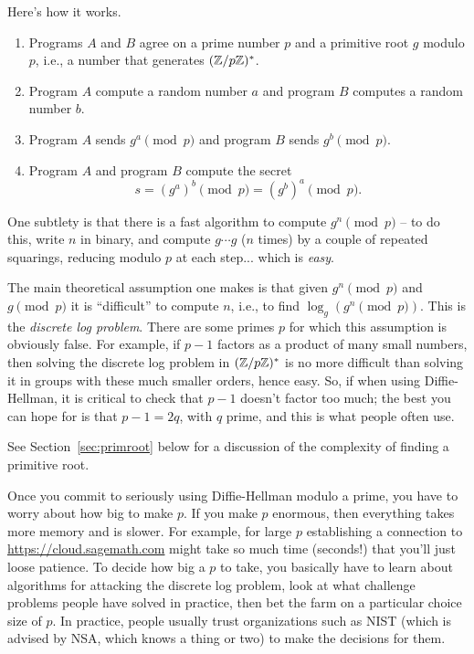 \documentclass{book}
\begin{document}
Here's how it works.
\begin{enumerate}
\item Programs $A$ and $B$ agree on a prime number $p$ and a primitive
root $g$ modulo $p$, i.e., a number that generates $(\mathbb{Z}/p\mathbb{Z})^*$.
\item Program $A$ compute a random number $a$ and program
$B$ computes a random number $b$.
\item Program $A$ sends $g^a\pmod{p}$ and program $B$
sends $g^b\pmod{p}$.
\item Program $A$ and program $B$ compute the secret
$$
   s = (g^a)^b\pmod{p} = (g^b)^a\pmod{p}.
$$
\end{enumerate}
One subtlety is that there is a fast algorithm to
compute $g^n\pmod{p}$ -- to do this, write $n$
in binary, and compute $g\cdots g$ ($n$ times)
by a couple of repeated squarings, reducing
modulo $p$ at each step... which is {\em easy}.

The main theoretical assumption one makes is that given $g^n\pmod{p}$
and $g\pmod{p}$ it is ``difficult'' to compute $n$, i.e., to find
$\log_g(g^n \pmod{p})$.  This is the {\em discrete log problem}.
There are some primes $p$ for which this assumption is obviously
false.  For example, if $p-1$ factors as a product of many small
numbers, then solving the discrete log problem in $(\mathbb{Z}/p\mathbb{Z})^*$ is
no more difficult than solving it in groups with these much smaller
orders, hence easy.   So, if when using Diffie-Hellman, it is critical
to check that $p-1$ doesn't factor too much; the best you can hope
for is that $p-1 = 2q$, with $q$ prime, and this is what people
often use.

 See Section~\ref{sec:primroot} below for a discussion of
 the complexity of finding a primitive root.

Once you commit to seriously using Diffie-Hellman modulo a prime, you have
to worry about how big to make $p$.  If you make $p$ enormous, then
everything takes more memory and is slower.  For example, for large $p$
establishing a connection to \url{https://cloud.sagemath.com} might
take so much time (seconds!) that you'll just loose patience.  To decide
how big a $p$ to take, you basically have to learn about algorithms for
attacking the discrete log problem, look at what challenge problems
people have solved in practice, then bet the farm on a particular
choice size of $p$.    In practice, people usually trust organizations
such as NIST (which is advised by NSA, which knows a thing or two)
to make the decisions for them.
\end{document}
